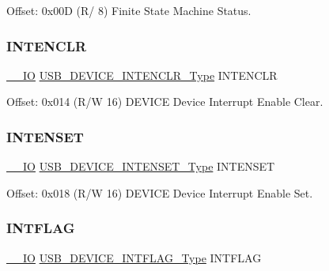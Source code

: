 Offset\+: 0x00D (R/ 8) Finite State Machine Status. 

\mbox{\label{struct_usb_device_a569c897d10b13f70fb9bfba1f33b3171}} 
\subsubsection{\texorpdfstring{INTENCLR}{INTENCLR}}
{\footnotesize\ttfamily \mbox{\hyperlink{core__cm0plus_8h_aec43007d9998a0a0e01faede4133d6be}{\+\_\+\+\_\+\+IO}} \mbox{\hyperlink{union_u_s_b___d_e_v_i_c_e___i_n_t_e_n_c_l_r___type}{U\+S\+B\+\_\+\+D\+E\+V\+I\+C\+E\+\_\+\+I\+N\+T\+E\+N\+C\+L\+R\+\_\+\+Type}} I\+N\+T\+E\+N\+C\+LR}



Offset\+: 0x014 (R/W 16) D\+E\+V\+I\+CE Device Interrupt Enable Clear. 

\mbox{\label{struct_usb_device_a9f694751d75c05c3156be03cf92e39bd}} 
\subsubsection{\texorpdfstring{INTENSET}{INTENSET}}
{\footnotesize\ttfamily \mbox{\hyperlink{core__cm0plus_8h_aec43007d9998a0a0e01faede4133d6be}{\+\_\+\+\_\+\+IO}} \mbox{\hyperlink{union_u_s_b___d_e_v_i_c_e___i_n_t_e_n_s_e_t___type}{U\+S\+B\+\_\+\+D\+E\+V\+I\+C\+E\+\_\+\+I\+N\+T\+E\+N\+S\+E\+T\+\_\+\+Type}} I\+N\+T\+E\+N\+S\+ET}



Offset\+: 0x018 (R/W 16) D\+E\+V\+I\+CE Device Interrupt Enable Set. 

\mbox{\label{struct_usb_device_a2aff6e5d29d7634e892def505df651f3}} 
\subsubsection{\texorpdfstring{INTFLAG}{INTFLAG}}
{\footnotesize\ttfamily \mbox{\hyperlink{core__cm0plus_8h_aec43007d9998a0a0e01faede4133d6be}{\+\_\+\+\_\+\+IO}} \mbox{\hyperlink{union_u_s_b___d_e_v_i_c_e___i_n_t_f_l_a_g___type}{U\+S\+B\+\_\+\+D\+E\+V\+I\+C\+E\+\_\+\+I\+N\+T\+F\+L\+A\+G\+\_\+\+Type}} I\+N\+T\+F\+L\+AG}



